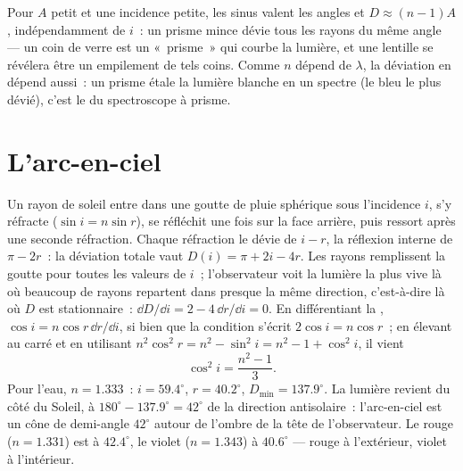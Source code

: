 \begin{remark}\label{rem:b1:rays-reflection-refraction:thin}
Pour $A$ petit et une incidence petite, les sinus valent les angles et
$D \approx (n - 1)A$, indépendamment de $i$~: un prisme mince dévie tous
les rayons du même angle --- un coin de verre est un «~prisme~» qui
courbe la lumière, et une lentille se révélera être un empilement de
tels coins. Comme $n$ dépend de $\lambda$, la déviation en dépend
aussi~: un prisme étale la lumière blanche en un spectre (le bleu le
plus dévié), c'est le  du spectroscope à prisme.
\end{remark}

\section{L'arc-en-ciel}

\begin{example}\label{ex:b1:rays-reflection-refraction:rainbow}
Un rayon de soleil entre dans une goutte de pluie sphérique sous
l'incidence $i$, s'y réfracte ($\sin i = n\sin r$), se réfléchit une
fois sur la face arrière, puis ressort après une seconde réfraction.
Chaque réfraction le dévie de $i - r$, la réflexion interne de
$\pi - 2r$~: la déviation totale vaut $D(i) = \pi + 2i - 4r$. Les rayons
remplissent la goutte pour toutes les valeurs de $i$~; l'observateur
voit la lumière la plus vive là où beaucoup de rayons repartent dans
presque la même direction, c'est-à-dire là où $D$ est stationnaire~:
$\dd D/\dd i = 2 - 4\,\dd r/\dd i
= 0$. En différentiant la ,
$\cos i = n\cos r\,\dd r/\dd i$, si bien que la condition s'écrit
$2\cos i = n\cos r$~; en élevant au carré et en utilisant
$n^2\cos^2 r = n^2 - \sin^2 i = n^2 - 1 + \cos^2 i$, il vient
\[
\cos^2 i = \frac{n^2 - 1}{3} .
\]
Pour l'eau, $n = 1.333$~: $i = 59.4^\circ$, $r = 40.2^\circ$,
$D_{\min} = 137.9^\circ$. La lumière revient du côté du Soleil, à
$180^\circ - 137.9^\circ = 42^\circ$ de la direction antisolaire~:
l'arc-en-ciel est un cône de demi-angle $42^\circ$ autour de l'ombre de
la tête de l'observateur. Le rouge ($n = 1.331$) est à $42.4^\circ$, le
violet ($n = 1.343$) à $40.6^\circ$ --- rouge à l'extérieur, violet à
l'intérieur.
\end{example}

